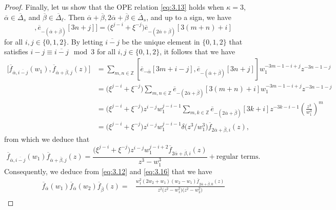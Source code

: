 \documentclass[pdftex]{sigma}
\numberwithin{equation}{section}
\begin{document}
\begin{proof}
Finally, let us show that the OPE relation \eqref{eq:3.13} holds when $\kappa=3$, $\overline{\alpha}\in\overline{\Delta}_s$ and $\overline{\beta}\in\overline{\Delta}_{\ell}$. Then $\overline{\alpha}+\overline{\beta},2\overline{\alpha}+\overline{\beta}\in\overline{\Delta}_s$, and up to a sign, we have
\begin{equation*}
[\overline{e}_{-\overline{\alpha}}[3m+i-j],\overline{e}_{-(\overline{\alpha}+\overline{\beta})}[3n+j]]
=\bigl(\xi^{j-i}+\xi^{-j}\bigr)\overline{e}_{-(2\overline{\alpha}+ \overline{\beta})}[3(m+n)+i]
\end{equation*}
for all $i,j\in\{0,1,2\}$. By letting $\overline{i-j}$ be the unique element in $\{0,1,2\}$ that satisfies $i-j\equiv \overline{i-j}\mod 3$ for all $i,j\in\{0,1,2\}$, it follows that we have
\begin{align*}
\bigl[\overline{f}_{\overline{\alpha},\overline{i-j}}(w_1), \overline{f}_{\overline{\alpha}+\overline{\beta},j}(z)\bigr]
&=\sum_{m,n\in\mathbb{Z}}[\overline{e}_{-\overline{\alpha}}[3m+i-j],\overline{e}_{-(\overline{\alpha}+\overline{\beta})}[3n+j]]w_1^{-3m-1-i+j}z^{-3n-1-j}\\
&=\bigl(\xi^{j-i}+\xi^{-j}\bigr)\sum_{m,n\in\mathbb{Z}}\overline{e}_{-(2\overline{\alpha}+\overline{\beta})}[3(m+n)+i]w_1^{-3m-1-i+j}z^{-3n-1-j}\\
&=\bigl(\xi^{j-i}+\xi^{-j}\bigr)z^{i-j}w_1^{j-i-1} \sum_{m,k\in\mathbb{Z}}\overline{e}_{-(2\overline{\alpha}+ \overline{\beta})}[3k+i]z^{-3k-i-1}\left(\frac{z^3}{w_1^3} \right)^m\\
&=\bigl(\xi^{j-i}+\xi^{-j}\bigr)z^{i-j}w_1^{j-i-1}\delta\bigl(z^3/w_1^3\bigr) \overline{f}_{2\overline{\alpha}+\overline{\beta},i}(z),
\end{align*}
from which we deduce that
\begin{equation}\label{eq:3.16}
\overline{f}_{\overline{\alpha},\overline{i-j}}(w_1)\overline{f}_{\overline{\alpha}+\overline{\beta},j}(z)
=\frac{\bigl(\xi^{j-i}+\xi^{-j}\bigr)z^{i-j}w_1^{j-i+2} \overline{f}_{2\overline{\alpha}+\overline{\beta},i}(z)}{z^3-w_1^3}+\text{regular terms}.
\end{equation}
Consequently, we deduce from \eqref{eq:3.12} and \eqref{eq:3.16} that we have
\begin{align}
\overline{f}_{\overline{\alpha}}(w_1) \overline{f}_{\overline{\alpha}}(w_2)
\overline{f}_{\overline{\beta}}(z)
={}&\frac{w_1^2(2w_2+w_1)(w_2-w_1)\overline{f}_{ 2\overline{\alpha}+\overline{\beta},0}(z)}{z^2\bigl(z^2-w_1^2\bigr)\bigl(z^2-w_2^2\bigr)}\nonumber\\

\end{align}
\end{proof}
\end{document}
